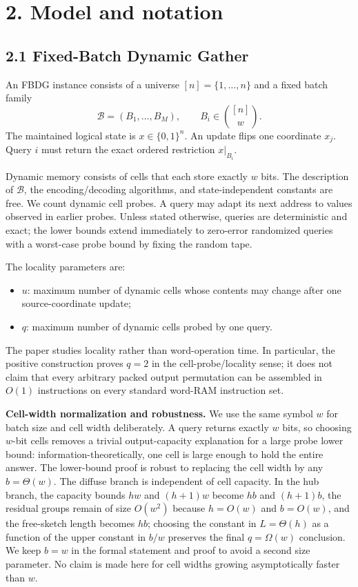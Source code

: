 \documentclass[
]{article}
\providecommand{\tightlist}{%
  \setlength{\itemsep}{0pt}\setlength{\parskip}{0pt}}
\begin{document}
\hypertarget{model-and-notation}{%
\section{2. Model and notation}\label{model-and-notation}}

\hypertarget{fixed-batch-dynamic-gather}{%
\subsection{2.1 Fixed-Batch Dynamic
Gather}\label{fixed-batch-dynamic-gather}}

An FBDG instance consists of a universe \([n]=\{1,\ldots,n\}\) and a
fixed batch family \[
\mathcal B=(B_1,\ldots,B_M),\qquad B_i\in\binom{[n]}{w}.
\] The maintained logical state is \(x\in\{0,1\}^n\). An update flips
one coordinate \(x_j\). Query \(i\) must return the exact ordered
restriction \(x|_{B_i}\).

Dynamic memory consists of cells that each store exactly \(w\) bits. The
description of \(\mathcal B\), the encoding/decoding algorithms, and
state-independent constants are free. We count dynamic cell probes. A
query may adapt its next address to values observed in earlier probes.
Unless stated otherwise, queries are deterministic and exact; the lower
bounds extend immediately to zero-error randomized queries with a
worst-case probe bound by fixing the random tape.

The locality parameters are:

\begin{itemize}
\tightlist
\item
  \(u\): maximum number of dynamic cells whose contents may change after
  one source-coordinate update;
\item
  \(q\): maximum number of dynamic cells probed by one query.
\end{itemize}

The paper studies locality rather than word-operation time. In
particular, the positive construction proves \(q=2\) in the
cell-probe/locality sense; it does not claim that every arbitrary packed
output permutation can be assembled in \(O(1)\) instructions on every
standard word-RAM instruction set.

\textbf{Cell-width normalization and robustness.} We use the same symbol
\(w\) for batch size and cell width deliberately. A query returns
exactly \(w\) bits, so choosing \(w\)-bit cells removes a trivial
output-capacity explanation for a large probe lower bound:
information-theoretically, one cell is large enough to hold the entire
answer. The lower-bound proof is robust to replacing the cell width by
any \(b=\Theta(w)\). The diffuse branch is independent of cell capacity.
In the hub branch, the capacity bounds \(hw\) and \((h+1)w\) become
\(hb\) and \((h+1)b\), the residual groups remain of size \(O(w^2)\)
because \(h=O(w)\) and \(b=O(w)\), and the free-sketch length becomes
\(hb\); choosing the constant in \(L=\Theta(h)\) as a function of the
upper constant in \(b/w\) preserves the final \(q=\Omega(w)\)
conclusion. We keep \(b=w\) in the formal statement and proof to avoid a
second size parameter. No claim is made here for cell widths growing
asymptotically faster than \(w\).
\end{document}
